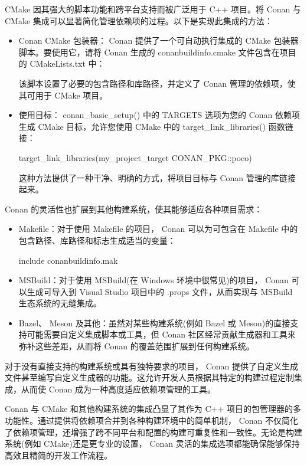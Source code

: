 
CMake 因其强大的脚本功能和跨平台支持而被广泛用于 C++ 项目。将 Conan 与 CMake 集成可以显著简化管理依赖项的过程。以下是实现此集成的方法：

\begin{itemize}
\item
Conan CMake 包装器： Conan 提供了一个可自动执行集成的 CMake 包装器脚本。要使用它，请将 Conan 生成的 conanbuildinfo.cmake 文件包含在项目的 CMakeLists.txt 中：


该脚本设置了必要的包含路径和库路径，并定义了 Conan 管理的依赖项，使其可用于 CMake 项目。

\item
使用目标： conan\_basic\_setup() 中的 TARGETS 选项为您的 Conan 依赖项生成 CMake 目标，允许您使用 CMake 中的 target\_link\_libraries() 函数链接：

\begin{cmake}
target_link_libraries(my_project_target CONAN_PKG::poco)
\end{cmake}

这种方法提供了一种干净、明确的方式，将项目目标与 Conan 管理的库链接起来。
\end{itemize}


Conan 的灵活性也扩展到其他构建系统，使其能够适应各种项目需求：

\begin{itemize}
\item
Makefile：对于使用 Makefile 的项目， Conan 可以为可包含在 Makefile 中的包含路径、库路径和标志生成适当的变量：

\begin{shell}
include conanbuildinfo.mak
\end{shell}

\item
MSBuild：对于使用 MSBuild(在 Windows 环境中很常见)的项目， Conan 可以生成可导入到 Visual Studio 项目中的 .props 文件，从而实现与 MSBuild 生态系统的无缝集成。

\item
Bazel、 Meson 及其他：虽然对某些构建系统(例如 Bazel 或 Meson)的直接支持可能需要自定义集成脚本或工具，但 Conan 社区经常贡献生成器和工具来弥补这些差距，从而将 Conan 的覆盖范围扩展到任何构建系统。
\end{itemize}


对于没有直接支持的构建系统或具有独特要求的项目， Conan 提供了自定义生成文件甚至编写自定义生成器的功能。这允许开发人员根据其特定的构建过程定制集成，从而使 Conan 成为一种高度适应依赖项管理的工具。


Conan 与 CMake 和其他构建系统的集成凸显了其作为 C++ 项目的包管理器的多功能性。通过提供将依赖项合并到各种构建环境中的简单机制， Conan 不仅简化了依赖项管理，还增强了跨不同平台和配置的构建可重复性和一致性。无论是构建系统(例如 CMake)还是更专业的设置， Conan 灵活的集成选项都能确保能够保持高效且精简的开发工作流程。


